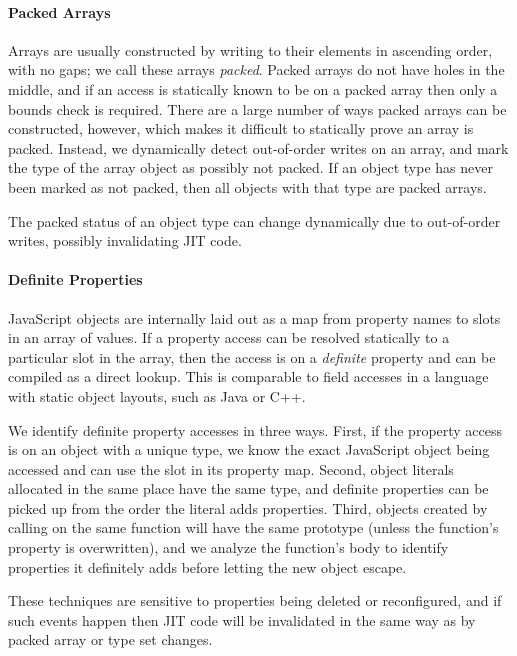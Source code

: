\paragraph{Packed Arrays}

Arrays are usually constructed by writing to their elements in ascending
order, with no gaps; we call these arrays {\it packed}.
Packed arrays do not have holes in the middle, and if an access is statically
known to be on a packed array then only a bounds check is required.
There are a large number of ways packed arrays can be constructed, however,
which makes it difficult to statically prove an array is packed.
Instead, we dynamically detect out-of-order writes on an array,
and mark the type of the array object as possibly not packed.
If an object type has never been marked as not packed, then all objects
with that type are packed arrays.


The packed status of an object type can change dynamically due to out-of-order
writes, possibly invalidating JIT code.

\paragraph{Definite Properties}
\label{sec:definite-properties}

JavaScript objects are internally laid out as a map from property names
to slots in an array of values.
If a property access can be resolved statically to a particular slot in the
array, then the access is on a {\it definite} property and can be compiled
as a direct lookup. This is comparable to
field accesses in a language with static object layouts,
such as Java or C++.

We identify definite property accesses in three ways.
First, if the property access is on an object with a unique type,
we know the exact JavaScript object being accessed and can use the slot
in its property map.
Second, object literals allocated in the same place have the same type,
and definite properties can be picked up from the order the literal
adds properties.
Third, objects created by calling  on the same function will have the
same prototype (unless the function's  property is overwritten),
and we analyze the function's body to identify properties it definitely
adds before letting the new object escape.

These techniques are sensitive to properties being deleted or
reconfigured, and if such events happen then JIT code will be invalidated
in the same way as by packed array or type set changes.

